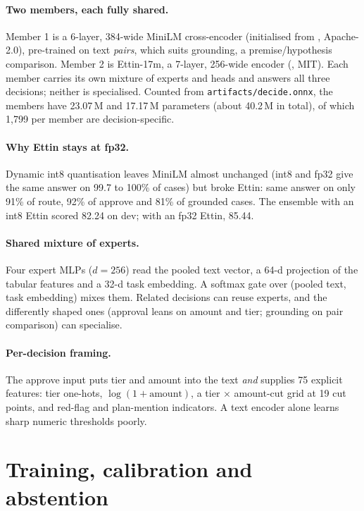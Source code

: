 \documentclass[11pt,a4paper]{article}
\begin{document}
\paragraph{Two members, each fully shared.} Member 1 is a 6-layer, 384-wide
MiniLM cross-encoder (initialised from ,
Apache-2.0), pre-trained on text \emph{pairs}, which suits grounding, a
premise/hypothesis comparison. Member 2 is Ettin-17m, a 7-layer, 256-wide
encoder (, MIT). Each member carries its own
mixture of experts and heads and answers all three decisions; neither is
specialised. Counted from \texttt{artifacts/decide.onnx}, the members have
23.07\,M and 17.17\,M parameters (about 40.2\,M in total), of which 1{,}799 per
member are decision-specific.

\paragraph{Why Ettin stays at fp32.} Dynamic int8 quantisation leaves MiniLM
almost unchanged (int8 and fp32 give the same answer on 99.7 to 100\% of
cases) but broke Ettin: same answer on only 91\% of route, 92\% of approve and
81\% of grounded cases. The ensemble with an int8 Ettin scored 82.24 on dev;
with an fp32 Ettin, 85.44.

\paragraph{Shared mixture of experts.} Four expert MLPs ($d=256$) read the pooled
text vector, a 64-d projection of the tabular features and a 32-d task embedding.
A softmax gate over (pooled text, task embedding) mixes them. Related decisions
can reuse experts, and the differently shaped ones (approval leans on amount and
tier; grounding on pair comparison) can specialise.

\paragraph{Per-decision framing.} The approve input puts tier and amount into
the text \emph{and} supplies 75 explicit features: tier one-hots, $\log(1+\text{amount})$,
a tier $\times$ amount-cut grid at 19 cut points, and red-flag and plan-mention
indicators. A text encoder alone learns sharp numeric thresholds poorly.

\section{Training, calibration and abstention}
\end{document}

